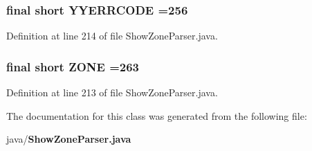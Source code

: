 \subsubsection[{Y\+Y\+E\+R\+R\+C\+O\+D\+E}]{\setlength{\rightskip}{0pt plus 5cm}final short Y\+Y\+E\+R\+R\+C\+O\+D\+E =256\hspace{0.3cm}{\ttfamily [static]}}\label{classorg_1_1smallfoot_1_1parser_1_1zone_1_1ShowZoneParser_a1c58472ea6621d2f613831e08d10dba3}


Definition at line 214 of file Show\+Zone\+Parser.\+java.

\subsubsection[{Z\+O\+N\+E}]{\setlength{\rightskip}{0pt plus 5cm}final short Z\+O\+N\+E =263\hspace{0.3cm}{\ttfamily [static]}}\label{classorg_1_1smallfoot_1_1parser_1_1zone_1_1ShowZoneParser_a8ddd6c0fce0f972519976a2c9ca1aadd}


Definition at line 213 of file Show\+Zone\+Parser.\+java.



The documentation for this class was generated from the following file\+:\begin{DoxyCompactItemize}
\item 
java/{\bf Show\+Zone\+Parser.\+java}\end{DoxyCompactItemize}
